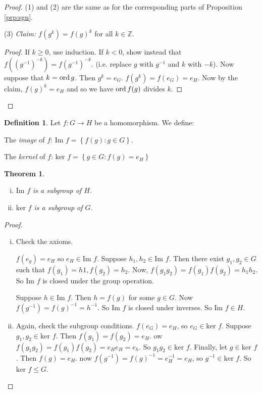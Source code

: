 \documentclass{article}
\newtheorem{theorem}{Theorem}
\theoremstyle{definition} \newtheorem*{definition}{Definition}
\begin{document}
\begin{proof} (1) and (2) are the same as for the corresponding parts of
  Proposition \ref{prp:sgn}.

  (3) \emph{Claim:} $f(g^k)=f(g)^k$ for all $k\in \mathbb{Z}.$ \begin{proof} If
    $k \geq 0$, use induction. If $k<0$, show instead that $f\left( \left(
    g^{-1} \right)^{-k} \right)=f(g^{-1})^{-k}$. (i.e. replace $g$ with
    $g^{-1}$ and $k$ with $-k$). Now suppose that $k=\operatorname{\text{ord}} g$. Then $g^k = e_G$.
    $f(g^k)=f(e_G)=e_H$. Now by the claim, $f(g)^k=e_H$ and so we have $\operatorname{\text{ord}}
    f(g)$ divides $k$.  \end{proof} \end{proof}

\begin{definition} Let $f:G \rightarrow H$ be a homomorphism. We define: 
  
  The \emph{image} of $f$: $\text{Im } f = \left\{ f(g) : g \in G \right\}$.

  The \emph{kernel} of $f$: $\text{ker } f=\left\{ g \in G : f(g) = e_H
  \right\}$\\ \end{definition}

\begin{theorem}\hfill \begin{enumerate}[(i)] \item $\text{Im } f$ is a subgroup of
        $H$.  \item $\text{ker } f$ is a subgroup of $G$.  \end{enumerate}
      \label{} \end{theorem}

\begin{proof}\hfill \begin{enumerate}[(i)] \item Check the axioms.

      $f(e_g)=e_H$ so $e_H \in \text{Im }f$.  Suppose $h_1, h_2 \in \text{Im }
      f$. Then there exist $g_1, g_2 \in G$ such that $f(g_1)=h1, f(g_2)=h_2$.
      Now, $f(g_1 g_2)=f(g_1)f(g_2)=h_1 h_2$. So $\text{Im }f$ is closed under
      the group operation.

      Suppose $h \in \text{Im }f. $ Then $h=f(g)$ for some $g \in G$. Now
      $f(g^{-1})=f(g)^{-1}=h^{-1}$. So $\text{Im }f$ is closed under inverses.
      So $\text{Im } f \in H $.

    \item Again, check the subgroup conditions.  $f(e_G)=e_H$, so $e_G \in
      \text{ker }f$. Suppose $g_1, g_2 \in \text{ker }f$. Then
      $f(g_1)=f(g_2)=e_H$. ow $f(g_1 g_2)=f(g_1)f(g_2)=e_He_H=e_h$. So $g_1 g_2
      \in \text{ker }f$. Finally, let $g \in \text{ker }f$. Then $f(g)=e_H$.
      now $f(g^{-1})=f(g)^{-1}=e_H^{-1}=e_H$, so $g^{-1} \in \text{ker }f$. So
      $\text{ker }f \leq G$.  \end{enumerate} \end{proof}
\end{document}
